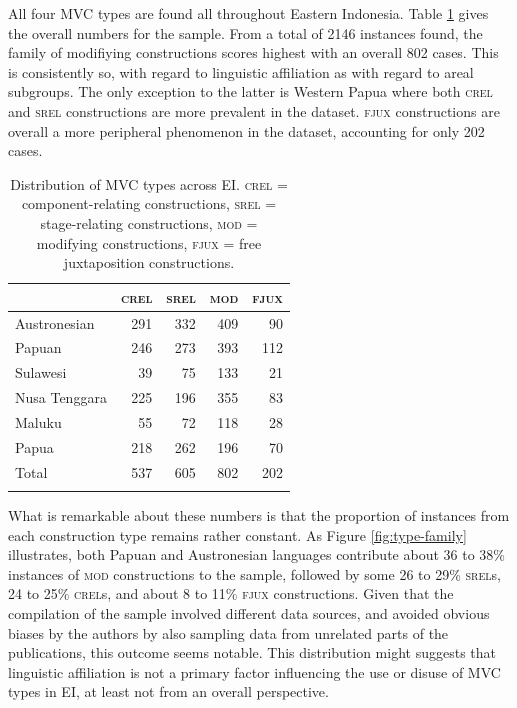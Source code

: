All four MVC types are found all throughout Eastern Indonesia. Table \ref{table:MVCtypes_overview} gives the overall numbers for the sample. From a total of 2146 instances found, the family of modifiying constructions scores highest with an overall 802 cases. This is consistently so, with regard to linguistic affiliation as with regard to areal subgroups. The only exception to the latter is Western Papua where both \textsc{crel} and \textsc{srel} constructions are more prevalent in the dataset. \textsc{fjux} constructions are overall a more peripheral phenomenon in the dataset, accounting for only 202 cases.

\begin{table}
\begin{tabular}{lrrrr}
  \lsptoprule
 & \textsc{crel} & \textsc{srel} & \textsc{mod} & \textsc{fjux} \tabularnewline 
  \hline
  Austronesian & 291 & 332 & 409 & 90 \tabularnewline
  Papuan & 246 & 273 &  393 &  112  \tabularnewline
   \hline
  Sulawesi & 39 & 75 & 133 & 21 \tabularnewline
  Nusa Tenggara & 225 & 196 & 355 & 83 \tabularnewline
  Maluku & 55 & 72 & 118 & 28 \tabularnewline 
  Papua & 218 & 262 & 196 & 70 \tabularnewline 
\lsptoprule
Total & 537 & 605 & 802 & 202 \tabularnewline
\lspbottomrule
\end{tabular}
\caption[Distribution of MVC types]{Distribution of MVC types across EI. \textsc{crel} = component-relating constructions, \textsc{srel} = stage-relating constructions, \textsc{mod} = modifying constructions, \textsc{fjux} = free juxtaposition constructions.}
\label{table:MVCtypes_overview}
\end{table}

What is remarkable about these numbers is that the proportion of instances from each construction type remains rather constant. As Figure \ref{fig:type-family} illustrates, both Papuan and Austronesian languages contribute about 36 to 38\% instances of \textsc{mod} constructions to the sample, followed by some 26 to 29\% \textsc{srel}s, 24 to 25\% \textsc{crel}s, and about 8 to 11\% \textsc{fjux} constructions. Given that the compilation of the sample involved different data sources, and avoided obvious biases by the authors by also sampling data from unrelated parts of the publications, this outcome seems notable. This distribution might suggests that linguistic affiliation is not a primary factor influencing the use or disuse of MVC types in EI, at least not from an overall perspective.

